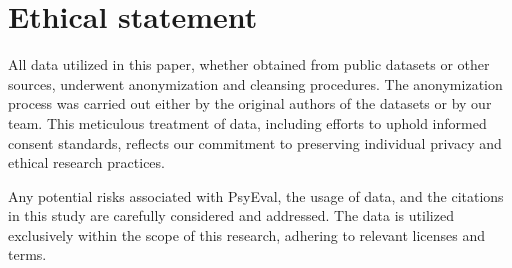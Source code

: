 
\section{Ethical statement}
All data utilized in this paper, whether obtained from public datasets or other sources, underwent anonymization and cleansing procedures. The anonymization process was carried out either by the original authors of the datasets or by our team. This meticulous treatment of data, including efforts to uphold informed consent standards, reflects our commitment to preserving individual privacy and ethical research practices. %

Any potential risks associated with PsyEval, the usage of data, and the citations in this study are carefully considered and addressed. The data is utilized exclusively within the scope of this research, adhering to relevant licenses and terms.